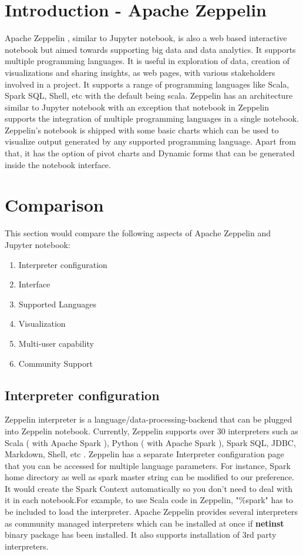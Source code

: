 \documentclass[9pt,twocolumn,twoside]{../../styles/osajnl}
\begin{document}
\section{Introduction - Apache Zeppelin}

Apache Zeppelin \cite{www-zeppelin}, similar to Jupyter notebook, is also a web based interactive notebook but aimed towards supporting big data and data analytics. It supports multiple programming languages. It is useful in exploration of data, creation of visualizations and sharing insights, as web pages, with various stakeholders involved in a project. It supports a range of programming languages like Scala, Spark SQL, Shell, etc with the default being scala. Zeppelin has an architecture similar to Jupyter notebook with an exception that notebook in Zeppelin supports the integration of multiple programming languages in a single notebook. Zeppelin's notebook is shipped with some basic charts which can be used to visualize output generated by any supported programming language. Apart from that, it has the option of pivot charts and Dynamic forms that can be generated inside the notebook interface. 

\section{Comparison}

This section would compare the following aspects of Apache Zeppelin and Jupyter notebook:
\begin{enumerate}
    \item Interpreter configuration
    \item Interface
    \item Supported Languages
    \item Visualization
    \item Multi-user capability
    \item Community Support
\end{enumerate}

\subsection{Interpreter configuration}

Zeppelin interpreter is a language/data-processing-backend that can be plugged into Zeppelin notebook. Currently, Zeppelin supports over 30 interpreters such as Scala ( with Apache Spark ), Python ( with Apache Spark ), Spark SQL, JDBC, Markdown, Shell, etc \cite{www-zeppelin-int}. Zeppelin has a separate Interpreter configuration page that you can be accessed for multiple language parameters. For instance, Spark home directory as well as spark master string can be modified to our preference. It would create the Spark Context automatically so you don't need to deal with it in each notebook.For example, to use Scala code in Zeppelin, "\%spark" has to be included to load the interpreter. Apache Zeppelin provides several interpreters as community managed interpreters \cite{www-zeppelin-int-install} which can be installed at once if \textbf{netinst} binary package has been installed. It also supports installation of 3rd party interpreters.\\
\end{document}
